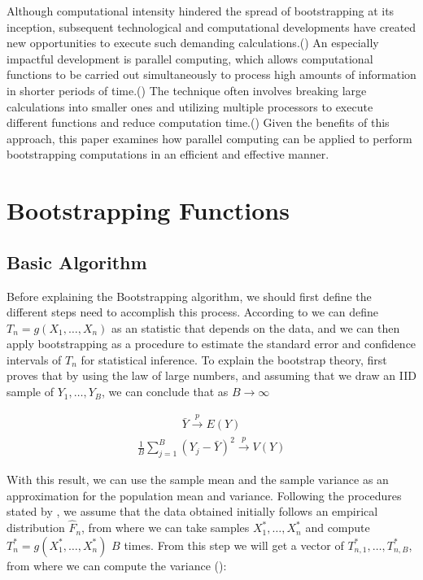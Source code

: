 \documentclass[11pt]{article}
\begin{document}
\medskip

Although computational intensity hindered the spread of bootstrapping at its inception, subsequent technological and
computational developments have created new opportunities to execute such demanding calculations.(\cite{Boos}) An especially
impactful development is parallel computing, which allows computational functions to be carried out simultaneously to
process high amounts of information in shorter periods of time.(\cite{Kindervater}) The technique often involves breaking large calculations
into smaller ones and utilizing multiple processors to execute different functions and reduce computation time.(\cite{Kindervater}) Given the
benefits of this approach, this paper examines how parallel computing can be applied to perform bootstrapping computations in
an efficient and effective manner.


\section{Bootstrapping Functions}\label{sec:bootstrapping-functions}

\subsection{Basic Algorithm}\label{subsec:basic-algorithm}

Before explaining the Bootstrapping algorithm, we should first define the different steps need to accomplish this process.
According to \cite{LW04} we can define $T_n = g(X_1, \dots, X_n)$ as an statistic that depends on the data, and we can then apply
bootstrapping as a procedure to estimate the standard error and confidence intervals of $T_n$ for statistical inference.
To explain the bootstrap theory, \cite{LW04} first proves that by using the law of large numbers, and assuming that we draw an IID sample of $Y_1, \dots, Y_B$,
we can conclude that as $B \rightarrow \infty$

\begin{align}
    \bar{Y} \overset{p}{\to} E(Y)
\end{align}
\begin{align}
    \frac{1}{B} \sum_{j=1}^{B}{(Y_j - \bar{Y})^{2}} \overset{p}{\to} V(Y)
\end{align}

With this result, we can use the sample mean and the sample variance as an approximation for the population mean and variance.
Following the procedures stated by \cite{LW04}, we assume that the data obtained initially follows an empirical distribution
$\hat{F}_n$, from where we can take samples $X_{1}^{*}, \dots, X_{n}^{*}$ and compute $T_{n}^{*} = g(X_{1}^{*}, \dots, X_{n}^{*})$
$B$ times. From this step we will get a vector of $T_{n,1}^{*}, \dots, T_{n,B}^{*}$, from where we can compute the variance
(\cite{LW04}):
\end{document}
